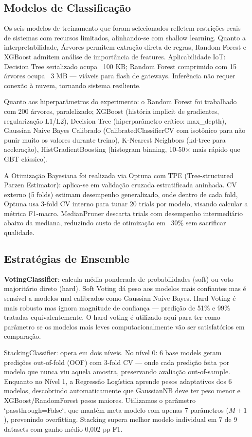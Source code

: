 \documentclass[12pt]{article}
\begin{document}
\subsection{Modelos de Classificação}

Os seis modelos de treinamento que foram selecionados refletem restrições reais de sistemas com recursos limitados, alinhando-se com shallow learning. Quanto a interpretabilidade, Árvores permitem extração direta de regras, Random Forest e XGBoost admitem análise de importância de features.
Aplicabilidade IoT: Decision Tree serializado ocupa ~100 KB; Random Forest comprimido com 15 árvores ocupa ~3 MB — viáveis para flash de gateways. Inferência não requer conexão à nuvem, tornando sistema resiliente.

Quanto aos hiperparâmetros do experimento: o Random Forest foi trabalhado com 200 árvores, paralelizado; XGBoost 
(história implicit de gradientes, regularização L1/L2), Decision Tree (hiperparâmetro crítico: max\_depth), Gaussian Naive Bayes Calibrado (CalibratedClassifierCV com isotônico para não punir muito os valores durante treino), K-Nearest Neighbors (kd-tree para aceleração), HistGradientBoosting (histogram binning, 10-50× mais rápido que GBT clássico).

A Otimização Bayesiana foi realizada via Optuna com TPE (Tree-structured Parzen Estimator): aplica-se em validação cruzada estratificada aninhada. CV externo (5 folds) estimam desempenho generalizado, onde dentro de cada fold, Optuna usa 3-fold CV interno para tunar 20 trials por modelo, visando calcular a  métrica F1-macro. MedianPruner descarta trials com desempenho intermediário abaixo da mediana, reduzindo custo de otimização em ~30\% sem sacrificar qualidade.

\subsection{Estratégias de Ensemble}

\textbf{VotingClassifier}: calcula média ponderada de probabilidades (soft) ou voto majoritário direto (hard). Soft Voting dá peso aos modelos mais confiantes mas é sensível a modelos mal calibrados como Gaussian Naive Bayes. Hard Voting é mais robusto mas ignora magnitude de confiança — predição de 51\% e 99\% tratadas equivalentemente. O hard voting é utilizado aqui para 
ter como parâmetro se os modelos mais leves computacionalmente vão ser satisfatórios em comparação.

StackingClassifier: opera em dois níveis. No nível 0: 6 base models geram predições out-of-fold (OOF) com 3-fold CV — 
onde cada predição feita por modelo que nunca viu aquela amostra, preservando avaliação out-of-sample. Enquanto no 
Nível 1, a  Regressão Logística aprende pesos adaptativos dos 6 modelos, descobrindo automaticamente que GaussianNB deve ter peso menor e XGBoost/RandomForest pesos maiores. Utilizamos o parâmetro `passthrough=False`, que mantém meta-modelo com apenas 7 parâmetros ($M+1$), prevenindo overfitting. Stacking supera melhor modelo individual em 7 de 9 datasets com ganho médio 0,002 pp F1.
\end{document}
